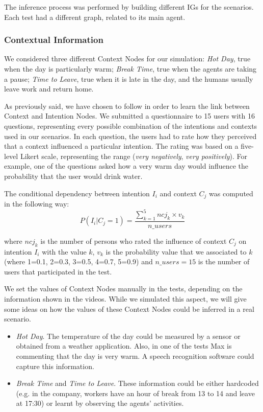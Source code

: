 The inference process was performed by building different IGs for the scenarios. Each test had a different graph, related to its main agent. 

\subsubsection{Contextual Information}
We considered three different Context Nodes for our simulation: \textit{Hot Day}, true when the day is particularly warm; \textit{Break Time}, true when the agents are taking a pause; \textit{Time to Leave}, true when it is late in the day, and the humans usually leave work and return home.

As previously said, we have chosen to follow \cite{Liu2014} in order to learn the link between Context and Intention Nodes. We submitted a questionnaire to 15 users with 16 questions, representing every possible combination of the intentions and contexts used in our scenarios. In each question,
the users had to rate how they perceived that a context influenced a particular intention. The rating was based on a five-level Likert scale, representing the range (\textit{very negatively}, \textit{very positively}). For example, one of the questions asked how a very warm day would influence the probability that the user would drink water.

The conditional dependency between intention $I_i$ and context $C_j$ was computed in the following way: 
\begin{equation}
 P(I_i|C_j=1)=\frac{\sum_{k=1}^5 ncj_k \times v_k}{n\_users}
\end{equation}

where $ncj_k$ is the number of persons who rated the influence of context $C_j$ on intention $I_i$ with the value $k$, $v_k$ is the probability value that we associated to $k$ (where 1=0.1, 2=0.3, 3=0.5, 4=0.7, 5=0.9) and $n\_users=15$ is the number of users that participated in the test.

We set the values of Context Nodes manually in the tests, depending  on the information shown in the videos. While we simulated this aspect, we will give some ideas on how the values of these Context Nodes could be inferred in a real scenario.

\begin{itemize}
\item \textit{Hot Day}. The temperature of the day could be measured by a sensor or obtained from a weather application. Also, in one of the tests Max is commenting that the day is very warm. A speech recognition software could capture this information.
\item \textit{Break Time} and \textit{Time to Leave}. These information could be either hardcoded (e.g. in the company, workers have an hour of break from 13 to 14 and leave at 17:30) or learnt by observing the agents' activities.
\end{itemize}



